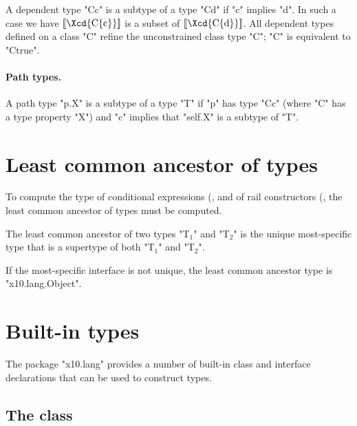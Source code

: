 A dependent type \xcd"C{c}" is a subtype of a type \xcd"C{d}" if
\xcd"c" implies \xcd"d".  In such a case we have
$\LL{\mbox{\Xcd{C\{c\}}}}$ is a
subset of $\LL{\mbox{\Xcd{C\{d\}}}}$. All dependent types
defined on a class \xcd"C"
refine the unconstrained class type \xcd"C"; \xcd"C" is
equivalent to \xcd"C{true}".

\paragraph{Path types.}

A path type \xcd"p.X" is a subtype of a type \xcd"T" if
\xcd"p" has type \xcd"C{c}" (where \xcd"C" has a type property
\xcd"X") and \xcd"c" implies that \xcd"self.X" is a subtype of \xcd"T".


\section{Least common ancestor of types}
\label{LCA}

To compute the type of conditional expressions
(,
and of rail constructors
(, the least common ancestor of types
must be computed.

The least common ancestor of two  types
\xcd"T$_1$" and \xcd"T$_2$"
is the
unique most-specific type
that is a supertype of both
\xcd"T$_1$" and \xcd"T$_2$".

If the most-specific interface is not unique, the
least common ancestor type is \xcd"x10.lang.Object".





\section{Built-in types}

The package \xcd"x10.lang" provides a number of built-in class and
interface declarations that can be used to construct types.

\subsection{The class }
\label{Object}

